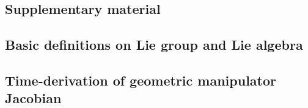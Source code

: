 % 
\begin{subappendices}
    \section{Supplementary material}
    \subsection{Basic definitions on Lie group and Lie algebra} 
    
    \label{app:C3:liegroup}   

    \subsection{Time-derivation of geometric manipulator Jacobian} 
    \label{app:C3:jacobian}   
    
    \end{subappendices}

\fi